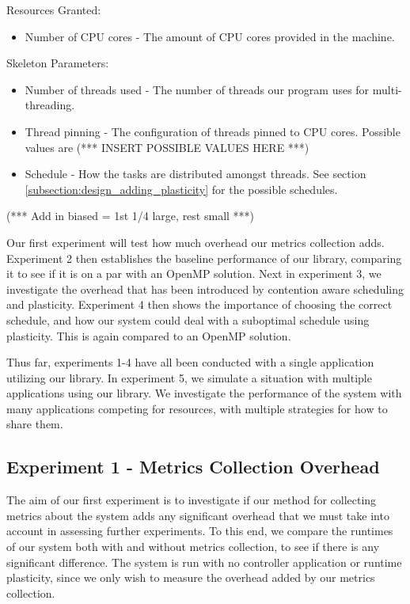 Resources Granted:

\begin{itemize}
	\item Number of CPU cores - The amount of CPU cores provided in the machine.
\end{itemize}

Skeleton Parameters:

\begin{itemize}
	\item Number of threads used - The number of threads our program uses for multi-threading.
	\item Thread pinning - The configuration of threads pinned to CPU cores. Possible values are (*** INSERT POSSIBLE VALUES HERE ***)
	\item Schedule - How the tasks are distributed amongst threads. See section \ref{subsection:design_adding_plasticity} for the possible schedules.
\end{itemize}

(*** Add in biased = 1st 1/4 large, rest small ***)

Our first experiment will test how much overhead our metrics collection adds. Experiment 2 then establishes the baseline performance of our library, comparing it to see if it is on a par with an OpenMP solution. Next in experiment 3, we investigate the overhead that has been introduced by contention aware scheduling and plasticity. Experiment 4 then shows the importance of choosing the correct schedule, and how our system could deal with a suboptimal schedule using plasticity. This is again compared to an OpenMP solution.

Thus far, experiments 1-4 have all been conducted with a single application utilizing our library. In experiment 5, we simulate a situation with multiple applications using our library. We investigate the performance of the system with many applications competing for resources, with multiple strategies for how to share them.



\subsection{Experiment 1 - Metrics Collection Overhead}

The aim of our first experiment is to investigate if our method for collecting metrics about the system adds any significant overhead that we must take into account in assessing further experiments. To this end, we compare the runtimes of our system both with and without metrics collection, to see if there is any significant difference. The system is run with no controller application or runtime plasticity, since we only wish to measure the overhead added by our metrics collection. 

